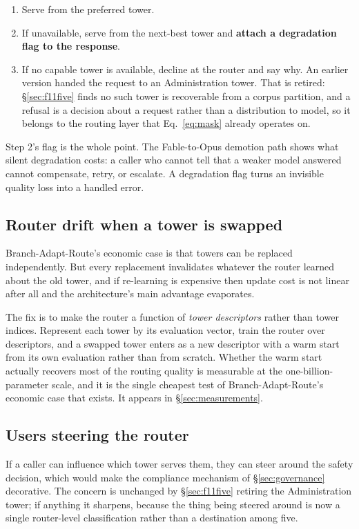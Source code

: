 \documentclass[11pt]{article}
\begin{document}
\begin{enumerate}[label=(\arabic*),itemsep=2pt]
\item Serve from the preferred tower.
\item If unavailable, serve from the next-best tower and \textbf{attach a degradation flag to the response}.
\item If no capable tower is available, decline at the router and say why. An earlier version handed the request to an Administration tower. That is retired: \S\ref{sec:f11five} finds no such tower is recoverable from a corpus partition, and a refusal is a decision about a request rather than a distribution to model, so it belongs to the routing layer that Eq.~\eqref{eq:mask} already operates on.
\end{enumerate}

Step 2's flag is the whole point. The Fable-to-Opus demotion path shows what silent degradation costs: a caller who cannot tell that a weaker model answered cannot compensate, retry, or escalate. A degradation flag turns an invisible quality loss into a handled error.

\subsection{Router drift when a tower is swapped}

Branch-Adapt-Route's economic case is that towers can be replaced independently. But every replacement invalidates whatever the router learned about the old tower, and if re-learning is expensive then update cost is not linear after all and the architecture's main advantage evaporates.

The fix is to make the router a function of \emph{tower descriptors} rather than tower indices. Represent each tower by its evaluation vector, train the router over descriptors, and a swapped tower enters as a new descriptor with a warm start from its own evaluation rather than from scratch. Whether the warm start actually recovers most of the routing quality is measurable at the one-billion-parameter scale, and it is the single cheapest test of Branch-Adapt-Route's economic case that exists. It appears in \S\ref{sec:measurements}.

\subsection{Users steering the router}

If a caller can influence which tower serves them, they can steer around the safety decision, which would make the compliance mechanism of \S\ref{sec:governance} decorative. The concern is unchanged by \S\ref{sec:f11five} retiring the Administration tower; if anything it sharpens, because the thing being steered around is now a single router-level classification rather than a destination among five.
\end{document}
